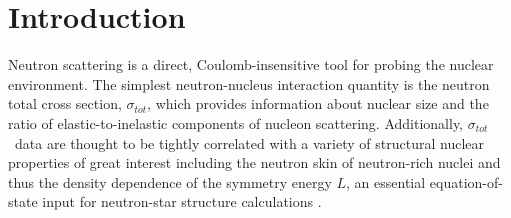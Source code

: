 \documentclass[twocolumn,secnumarabic,amssymb, nobibnotes, aps, prl,
superscriptaddress, nobalancelastpage, floatfix]{revtex4}
\newcommand{\tot}{\ensuremath{\sigma_{tot}}}
\begin{document}
\author{H. Y. Lee}
\author{M. Devlin}
\author{N. Fotiades}
\author{S. Mosby}
\maketitle

\section{Introduction}
Neutron scattering is a direct, Coulomb-insensitive tool for probing the nuclear
environment. The simplest neutron-nucleus interaction quantity is 
the neutron total cross section, \tot, which provides information about
nuclear size and the ratio of elastic-to-inelastic components of nucleon 
scattering. Additionally, \tot\ data are thought to be tightly correlated with
a variety of structural nuclear properties of great interest
including the neutron skin of neutron-rich nuclei
\cite{Mahzoon2017} and thus the density dependence of the symmetry energy $L$,
an essential equation-of-state input for neutron-star
structure calculations \cite{Fattoyev2012, Vinas2014, Brown2000}.
\end{document}
